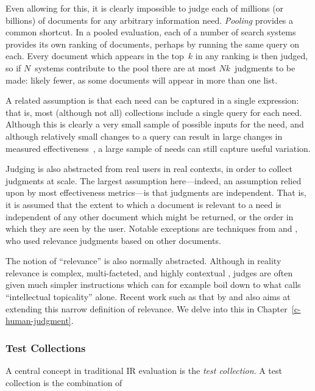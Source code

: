 Even allowing for this, it is clearly impossible to judge each of millions (or billions) of documents for any arbitrary information need. \emph{Pooling} provides a common shortcut. \cite{} In a pooled evaluation, each of a number of search systems provides its own ranking of documents, perhaps by running the same query on each. Every document which appears in the top~$k$ in any ranking is then judged, so if $N$~systems contribute to the pool there are at most $Nk$~judgments to be made: likely fewer, as some documents will appear in more than one list.

A related assumption is that each need can be captured in a single expression: that is, most (although not all) collections include a single query for each need.  Although this is clearly a very small sample of possible inputs for the need, and although relatively small changes to a query can result in large changes in measured effectiveness~\citep{bailey15user}, a large sample of needs can still capture useful variation.

Judging is also abstracted from real users in real contexts, in order to collect judgments at scale. The largest assumption here---indeed, an assumption relied upon by most effectiveness metrics---is that judgments are independent. That is, it is assumed that the extent to which a document is relevant to a need is independent of any other document which might be returned, or the order in which they are seen by the user. Notable exceptions are techniques from \cite{Golbus:2014:CDR} and \cite{Chandar2013}, who used relevance judgments based on other documents.

The notion of ``relevance'' is also normally abstracted. Although in reality relevance is complex, multi-facteted, and highly contextual \citep{borlund2003,saracevic16relevance}, judges are often given much simpler instructions which can for example boil down to what \cite{borlund2003} calls ``intellectual topicality'' alone. Recent work such as that by \cite{Mao:2016} and \cite{VermaYC16} also aims at extending this narrow definition of relevance. We delve into this in Chapter~\ref{c-human-judgment}.

\subsubsection{Test Collections}

A central concept in traditional IR evaluation is the \emph{test collection}. A test collection is the combination of 


